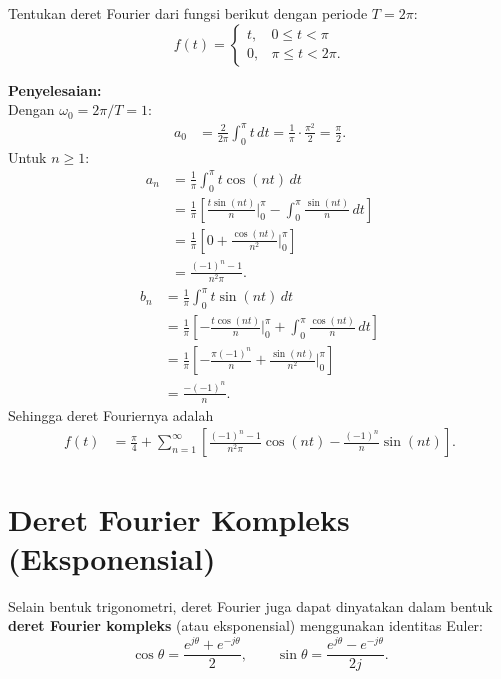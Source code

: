 \begin{exmp}
Tentukan deret Fourier dari fungsi berikut dengan periode $T = 2\pi$:
\[
f(t) = \begin{cases} t, & 0 \le t < \pi \\ 0, & \pi \le t < 2\pi. \end{cases}
\]

\textbf{Penyelesaian:}\\
Dengan $\omega_0 = 2\pi/T = 1$:
\begin{align*}
a_0 &= \frac{2}{2\pi}\int_{0}^{\pi} t\,dt = \frac{1}{\pi}\cdot\frac{\pi^2}{2} = \frac{\pi}{2}.
\end{align*}
Untuk $n \ge 1$:
\begin{align*}
a_n &= \frac{1}{\pi}\int_{0}^{\pi} t\cos(nt)\,dt \\
    &= \frac{1}{\pi}\left[\frac{t\sin(nt)}{n}\Big|_0^\pi - \int_0^\pi\frac{\sin(nt)}{n}\,dt\right] \\
    &= \frac{1}{\pi}\left[0 + \frac{\cos(nt)}{n^2}\Big|_0^\pi\right] \\
    &= \frac{(-1)^n - 1}{n^2\pi}.
\end{align*}
\begin{align*}
b_n &= \frac{1}{\pi}\int_{0}^{\pi} t\sin(nt)\,dt \\
    &= \frac{1}{\pi}\left[-\frac{t\cos(nt)}{n}\Big|_0^\pi + \int_0^\pi\frac{\cos(nt)}{n}\,dt\right] \\
    &= \frac{1}{\pi}\left[-\frac{\pi(-1)^n}{n} + \frac{\sin(nt)}{n^2}\Big|_0^\pi\right] \\
    &= \frac{-(-1)^n}{n}.
\end{align*}
Sehingga deret Fouriernya adalah
\begin{equation*}
\begin{split}
f(t) &= \frac{\pi}{4} + \sum_{n=1}^{\infty}\left[\frac{(-1)^n-1}{n^2\pi}\cos(nt) - \frac{(-1)^n}{n}\sin(nt)\right].
\end{split}
\end{equation*}
\end{exmp}

\section{Deret Fourier Kompleks (Eksponensial)}

Selain bentuk trigonometri, deret Fourier juga dapat dinyatakan dalam bentuk \textbf{deret Fourier kompleks} (atau eksponensial) menggunakan identitas Euler:
\[
\cos\theta = \frac{e^{j\theta}+e^{-j\theta}}{2}, \qquad \sin\theta = \frac{e^{j\theta}-e^{-j\theta}}{2j}.
\]

